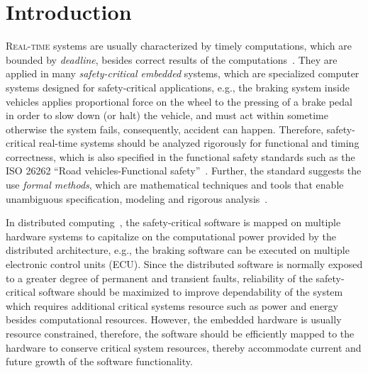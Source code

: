 \chapter{Introduction}\label{chapter_introduction}
\lettrine{R}{eal-time} systems are usually characterized by timely computations, which are bounded by \textit{deadline}, besides correct results of the computations~\cite{Buttazzo2003}. They are applied in many \textit{safety-critical embedded} systems, which are specialized computer systems designed for safety-critical applications, e.g., the braking system inside vehicles applies proportional force on the wheel to the pressing of a brake pedal in order to slow down (or halt) the vehicle, and must act within sometime otherwise the system fails, consequently, accident can happen. Therefore, safety-critical real-time systems should be analyzed rigorously for functional and timing correctness, which is also specified in the functional safety standards such as the ISO 26262 ``Road vehicles-Functional safety''~\cite{iso201126262}. Further, the standard suggests the use \textit{formal methods}, which are mathematical techniques and tools that enable unambiguous specification, modeling and rigorous analysis~\cite{o2017concise}.

In distributed computing~\cite{Kopetz2003Real-timeApplications}, the safety-critical software is mapped on multiple hardware systems to capitalize on the computational power provided by the distributed architecture, e.g., the braking software can be executed on multiple electronic control units (ECU). Since the distributed software is  normally exposed to a greater degree of permanent and transient faults, reliability of the safety-critical software should be maximized to improve dependability of the  system which requires additional critical systems resource such as power and energy besides computational resources. However, the embedded hardware is usually resource constrained, therefore, the software should be efficiently mapped to the hardware to conserve critical system resources, thereby accommodate current and future growth of the software functionality.

